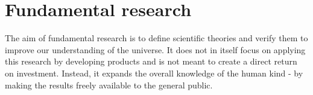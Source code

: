%
%
%
%
%

 




\clearpage
\section{Fundamental research}
\label{sec:fundphy}
The aim of fundamental research is to define scientific theories and verify them to improve our understanding of the universe. It does not in itself focus on applying this research by developing products and is not meant to create a direct return on investment. Instead, it expands the overall knowledge of the human kind - by making the results freely available to the general public.

